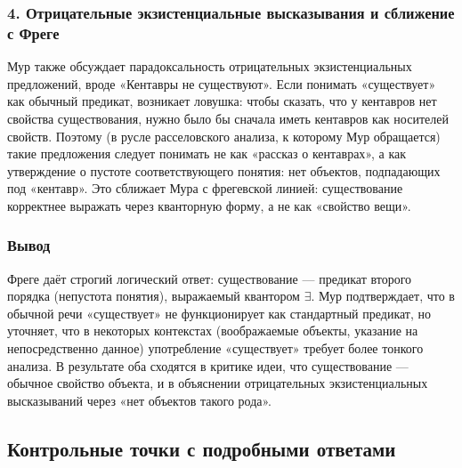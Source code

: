\documentclass[a4paper,12pt]{article}
\begin{document}
\subsubsection*{4. Отрицательные экзистенциальные высказывания и сближение с Фреге}

Мур также обсуждает парадоксальность отрицательных экзистенциальных предложений, вроде «Кентавры не существуют». Если понимать «существует» как обычный предикат, возникает ловушка: чтобы сказать, что у кентавров нет свойства существования, нужно было бы сначала иметь кентавров как носителей свойств. Поэтому (в русле расселовского анализа, к которому Мур обращается) такие предложения следует понимать не как «рассказ о кентаврах», а как утверждение о пустоте соответствующего понятия: нет объектов, подпадающих под «кентавр». Это сближает Мура с фрегевской линией: существование корректнее выражать через кванторную форму, а не как «свойство вещи».

\subsubsection*{Вывод}

Фреге даёт строгий логический ответ: существование — предикат второго порядка (непустота понятия), выражаемый квантором $\exists$. Мур подтверждает, что в обычной речи «существует» не функционирует как стандартный предикат, но уточняет, что в некоторых контекстах (воображаемые объекты, указание на непосредственно данное) употребление «существует» требует более тонкого анализа. В результате оба сходятся в критике идеи, что существование — обычное свойство объекта, и в объяснении отрицательных экзистенциальных высказываний через «нет объектов такого рода».

\subsection{Контрольные точки с подробными ответами}
\end{document}
